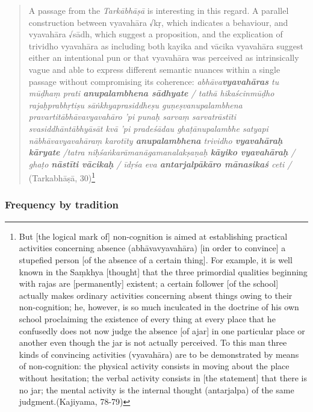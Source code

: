 \documentclass[
  letterpaper,
  DIV=11,
  numbers=noendperiod,
  oneside]{scrreprt}
\begin{document}
\begin{quote}
A passage from the \emph{Tarkābhāṣā} is interesting in this regard. A
parallel construction between vyavahāra √kṛ, which indicates a
behaviour, and vyavahāra √sādh, which suggest a proposition, and the
explication of trividho vyavahāra as including both kayika and vācika
vyavahāra suggest either an intentional pun or that vyavahāra was
perceived as intrinsically vague and able to express different semantic
nuances within a single passage without compromising its coherence:
\emph{abhāva\textbf{vyavahāras} tu mūḍhaṃ prati \textbf{anupalambhena
sādhyate} / tathā hikaścinmūḍho rajaḥprabhṛtiṣu sāṅkhyaprasiddheṣu
guṇeṣvanupalambhena pravartitābhāvavyavahāro 'pi punaḥ sarvaṃ
sarvatrāstīti svasiddhāntābhyāsāt kvā 'pi pradeśādau ghaṭānupalambhe
satyapi nābhāvavyavahāraṃ karotīty \textbf{anupalambhena} trividho
\textbf{vyavahāraḥ kāryate} /tatra niḥśaṅkarāmanāgamanalakṣaṇaḥ
\textbf{kāyiko vyavahāraḥ} / ghaṭo \textbf{nāstīti vācikaḥ} / īdṛśa eva
\textbf{antarjalpākāro mānasikaś} ceti /} (Tarkabhāṣā, 30)\footnote{But
  {[}the logical mark of{]} non-cognition is aimed at establishing
  practical activities concerning absence (abhāvavyavahāra) {[}in order
  to convince{]} a stupefied person {[}of the absence of a certain
  thing{]}. For example, it is well known in the Saṃkhya {[}thought{]}
  that the three primordial qualities beginning with rajas are
  {[}permanently{]} existent; a certain follower {[}of the school{]}
  actually makes ordinary activities concerning absent things owing to
  their non-cognition; he, however, is so much inculcated in the
  doctrine of his own school proclaiming the existence of every thing at
  every place that he confusedly does not now judge the absence {[}of
  ajar{]} in one particular place or another even though the jar is not
  actually perceived. To this man three kinds of convincing activities
  (vyavahāra) are to be demonstrated by means of non-cognition: the
  physical activity consists in moving about the place without
  hesitation; the verbal activity consists in {[}the statement{]} that
  there is no jar; the mental activity is the internal thought
  (antarjalpa) of the same judgment.(Kajiyama, 78-79)}
\end{quote}

\hypertarget{sec-traditionBars}{%
\subsubsection{Frequency by tradition}\label{sec-traditionBars}}
\end{document}
